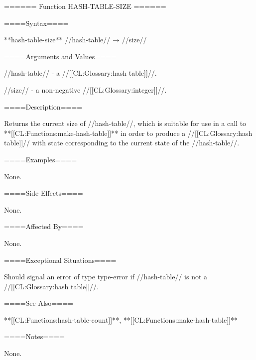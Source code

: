 ====== Function HASH-TABLE-SIZE ======

====Syntax====

**hash-table-size** //hash-table// → //size//

====Arguments and Values====

//hash-table// - a //[[CL:Glossary:hash table]]//.

//size// - a non-negative //[[CL:Glossary:integer]]//.

====Description====

Returns the current size of //hash-table//, which is suitable for use in a call to **[[CL:Functions:make-hash-table]]** in order to produce a //[[CL:Glossary:hash table]]// with state corresponding to the current state of the //hash-table//.

====Examples====

None.

====Side Effects====

None.

====Affected By====

None.

====Exceptional Situations====

Should signal an error of type type-error if //hash-table// is not a //[[CL:Glossary:hash table]]//.

====See Also====

**[[CL:Functions:hash-table-count]]**, **[[CL:Functions:make-hash-table]]**

====Notes====

None.

